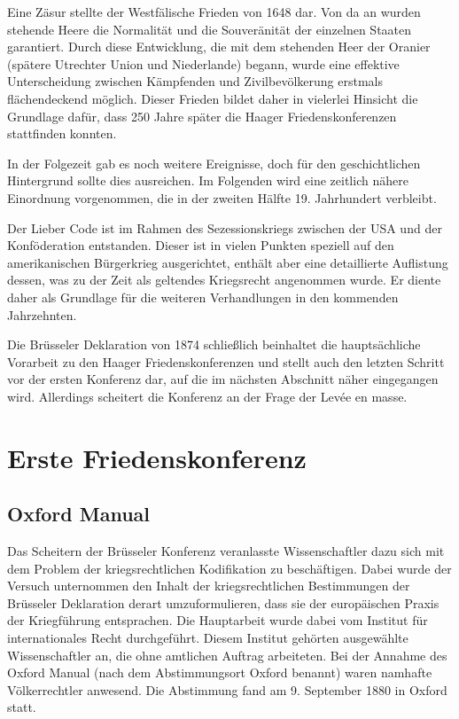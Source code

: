 \documentclass[12pt]{scrartcl}
\begin{document}
Eine Zäsur stellte der Westfälische Frieden von 1648 dar. Von da an wurden stehende Heere die Normalität und die Souveränität der einzelnen Staaten garantiert. Durch diese Entwicklung, die mit dem stehenden Heer der Oranier (spätere Utrechter Union und Niederlande) begann, wurde eine effektive Unterscheidung zwischen Kämpfenden und Zivilbevölkerung erstmals flächendeckend möglich. Dieser Frieden bildet daher in vielerlei Hinsicht die Grundlage dafür, dass 250 Jahre später die Haager Friedenskonferenzen stattfinden konnten.

In der Folgezeit gab es noch weitere Ereignisse, doch für den geschichtlichen Hintergrund sollte dies ausreichen. Im Folgenden wird eine zeitlich nähere Einordnung vorgenommen, die in der zweiten Hälfte 19. Jahrhundert verbleibt.

Der Lieber Code ist im Rahmen des Sezessionskriegs zwischen der USA und der Konföderation entstanden. Dieser ist in vielen Punkten speziell auf den amerikanischen Bürgerkrieg ausgerichtet, enthält aber eine detaillierte Auflistung dessen, was zu der Zeit als geltendes Kriegsrecht angenommen wurde. Er diente daher als Grundlage für die weiteren Verhandlungen in den kommenden Jahrzehnten.

Die Brüsseler Deklaration von 1874 schließlich beinhaltet die hauptsächliche Vorarbeit zu den Haager Friedenskonferenzen und stellt auch den letzten Schritt vor der ersten Konferenz dar, auf die im nächsten Abschnitt näher eingegangen wird. Allerdings scheitert die Konferenz an der Frage der Levée en masse.

\section{Erste Friedenskonferenz}

\subsection{Oxford Manual}

Das Scheitern der Brüsseler Konferenz veranlasste Wissenschaftler dazu sich mit dem Problem der kriegsrechtlichen Kodifikation zu beschäftigen. Dabei wurde der Versuch unternommen den Inhalt der kriegsrechtlichen Bestimmungen der Brüsseler Deklaration derart umzuformulieren, dass sie der europäischen Praxis der Kriegführung entsprachen. Die Hauptarbeit wurde dabei vom Institut für internationales Recht durchgeführt. Diesem Institut gehörten ausgewählte Wissenschaftler an, die ohne amtlichen Auftrag arbeiteten. Bei der Annahme des Oxford Manual (nach dem Abstimmungsort Oxford benannt) waren namhafte Völkerrechtler anwesend. Die Abstimmung fand am 9. September 1880 in Oxford statt.\cite{Buss1992}
\end{document}
